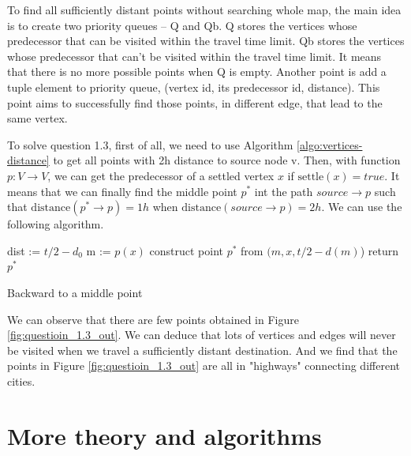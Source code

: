 \documentclass[titlepage,11pt,a4paper]{article}
\begin{document}
To find all sufficiently distant points without searching whole map, the main idea is to create two priority queues -- Q and Qb. Q stores the vertices whose predecessor that can be visited within the travel time limit. Qb stores the vertices whose predecessor that can't be visited within the travel time limit. It means that there is no more possible points when Q is empty. Another point is add a tuple element to priority queue, (vertex id, its predecessor id, distance). This point aims to successfully find those points, in different edge, that lead to the same vertex.


To solve question 1.3, first of all, we need to use Algorithm \ref{algo:vertices-distance} to get all points with 2h distance to source node v. Then, with function $p: V \rightarrow V$, we can get the predecessor of a settled vertex $x$ if $\mathrm{settle}(x) = true$. It means that we can finally find the middle point $p^*$ int the path $source\rightarrow p$ such that $\mathrm{distance}(p^*\rightarrow p) = 1h$ when $\mathrm{distance}(source \rightarrow p) = 2h$. We can use the following algorithm.


\begin{algorithm}[H]

 dist := $t/2 - d_0$\;
 m := $p(x)$\;
 construct point $p^*$ from $(m, x, t/2 - d(m)$)\;
 return $p^*$\;
 \caption{Backward to a middle point}
 \label{algo:Backward}
\end{algorithm}



We can observe that there are few points obtained in Figure \ref{fig:questioin_1.3_out}. We can deduce that lots of vertices and edges will never be visited when we travel a sufficiently distant destination. And we find that the points in Figure \ref{fig:questioin_1.3_out} are all in "highways" connecting different cities.

\section{More theory and algorithms}
\end{document}
